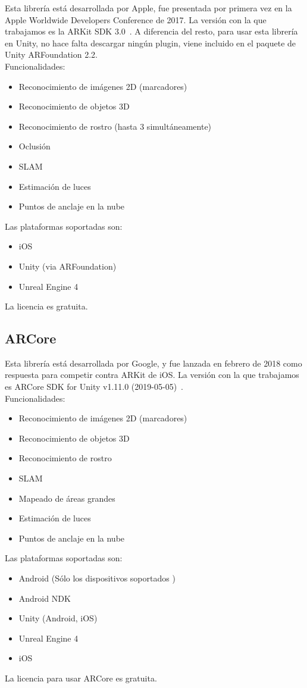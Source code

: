 Esta librería está desarrollada por Apple, fue presentada por primera vez en la Apple Worldwide Developers Conference de 2017.
La versión con la que trabajamos es la ARKit SDK 3.0~\cite{AppleDeve}. A diferencia del resto, para usar esta librería en Unity, no hace falta descargar ningún plugin, viene incluido en el paquete de Unity ARFoundation 2.2.\\

Funcionalidades:
\begin{itemize}
\item Reconocimiento de imágenes 2D (marcadores)
\item Reconocimiento de objetos 3D
\item Reconocimiento de rostro (hasta 3 simultáneamente)
\item Oclusión
\item SLAM
\item Estimación de luces
\item Puntos de anclaje en la nube
\end{itemize}
Las plataformas soportadas son:
\begin{itemize}
\item iOS 
\item Unity (via ARFoundation)
\item Unreal Engine 4~\cite{Unreal}
\end{itemize}
La licencia es gratuita.

\subsection{ARCore}\label{ARCore_Sec}


Esta librería está desarrollada por Google, y fue lanzada en febrero de 2018 como respuesta para competir contra ARKit de iOS. La versión con la que trabajamos es ARCore SDK for Unity v1.11.0 (2019-05-05)~\cite{ARCore}.\\

Funcionalidades:
\begin{itemize}
\item Reconocimiento de imágenes 2D (marcadores)
\item Reconocimiento de objetos 3D
\item Reconocimiento de rostro
\end{itemize}
\begin{itemize}
\item SLAM
\item Mapeado de áreas grandes
\item Estimación de luces
\item Puntos de anclaje en la nube
\end{itemize}
Las plataformas soportadas son:
\begin{itemize}
\item Android (Sólo los dispositivos soportados \cite{ARCoreList})
\item Android NDK
\item Unity (Android, iOS)
\item Unreal Engine 4
\item iOS
\end{itemize}
La licencia para usar ARCore es gratuita.


